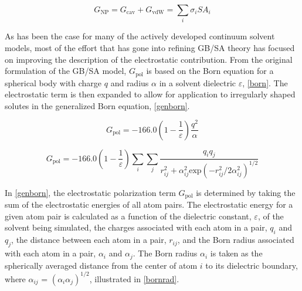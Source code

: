 \documentclass[12pt]{report}
\begin{document}
\vspace*{-0.4cm}
\begin{equation}
\label{npsum}
G_{\textrm{NP}} = G_{\textrm{cav}} + G_{\textrm{vdW}} = \sum_{i}{\sigma_{i} SA_{i}}
\end{equation}
\vspace*{-0.8cm}

As has been the case for many of the actively developed continuum solvent models, most of the effort that has gone into refining GB/SA theory has focused on improving the description of the electrostatic contribution. \cite{orozco, floris, grant, jayaram} From the original formulation of the GB/SA model,\cite{still} $G_{\textrm{pol}}$ is based on the Born equation for a spherical body with charge $q$ and radius $\alpha$ in a solvent dielectric $\varepsilon$, \cref{born}. The electrostatic term is then expanded to allow for application to irregularly shaped solutes in the generalized Born equation, \cref{genborn}.

\vspace*{-0.4cm}
\begin{equation}
\label{born}
G_{\textrm{pol}} = -166.0 \left(1 - \frac{1}{\varepsilon}\right) \frac{q^{2}}{\alpha}
\end{equation}
\vspace*{-0.8cm}

\vspace*{-0.2cm}
\begin{equation}
\label{genborn}
G_{\textrm{pol}} = -166.0 \left( 1 - \frac{1}{\varepsilon} \right) \sum_i \sum_j \frac{q_i q_j}{r_{ij}^{2} + \alpha_{ij}^{2} \textrm{exp} (-r_{ij}^{2} / 2 \alpha_{ij}^{2})^{1/2}}
\end{equation}
\vspace*{-0.1cm}

In \cref{genborn}, the electrostatic polarization term $G_{\textrm{pol}}$ is determined by taking the sum of the electrostatic energies of all atom pairs. The electrostatic energy for a given atom pair is calculated as a function of the dielectric constant, $\varepsilon$, of the solvent being simulated, the charges associated with each atom in a pair, $q_{i}$ and $q_{j}$, the distance between each atom in a pair, $r_{ij}$, and the Born radius associated with each atom in a pair, $\alpha_{i}$ and $\alpha_{j}$. The Born radius $\alpha_{i}$ is taken as the spherically averaged distance from the center of atom $i$ to its dielectric boundary, where $\alpha_{ij}$ = $(\alpha_{i}\alpha_{j})^{1/2}$, illustrated in \cref{bornrad}. 
\vspace*{1cm}
\end{document}
